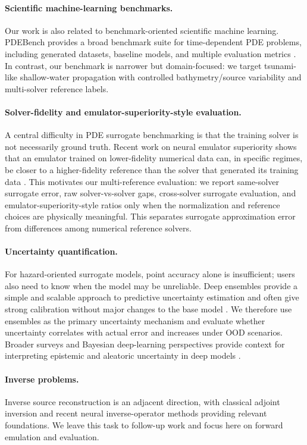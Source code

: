 \paragraph{Scientific machine-learning benchmarks.}
Our work is also related to benchmark-oriented scientific machine learning. PDEBench provides a broad benchmark suite for time-dependent PDE problems, including generated datasets, baseline models, and multiple evaluation metrics \citep{takamoto2022pdebench}. In contrast, our benchmark is narrower but domain-focused: we target tsunami-like shallow-water propagation with controlled bathymetry/source variability and multi-solver reference labels.

\paragraph{Solver-fidelity and emulator-superiority-style evaluation.}
A central difficulty in PDE surrogate benchmarking is that the training solver is not necessarily ground truth. Recent work on neural emulator superiority shows that an emulator trained on lower-fidelity numerical data can, in specific regimes, be closer to a higher-fidelity reference than the solver that generated its training data \citep{koehler2026emulator}. This motivates our multi-reference evaluation: we report same-solver surrogate error, raw solver-vs-solver gaps, cross-solver surrogate evaluation, and emulator-superiority-style ratios only when the normalization and reference choices are physically meaningful. This separates surrogate approximation error from differences among numerical reference solvers.

\paragraph{Uncertainty quantification.}
For hazard-oriented surrogate models, point accuracy alone is insufficient; users also need to know when the model may be unreliable. Deep ensembles provide a simple and scalable approach to predictive uncertainty estimation and often give strong calibration without major changes to the base model \citep{lakshminarayanan2017deepensembles}. We therefore use ensembles as the primary uncertainty mechanism and evaluate whether uncertainty correlates with actual error and increases under OOD scenarios. Broader surveys and Bayesian deep-learning perspectives provide context for interpreting epistemic and aleatoric uncertainty in deep models \citep{he2023uqsurvey,wilson2020bayesian}.

\paragraph{Inverse problems.}
Inverse source reconstruction is an adjacent direction, with classical adjoint inversion and recent neural inverse-operator methods providing relevant foundations. We leave this task to follow-up work and focus here on forward emulation and evaluation.
